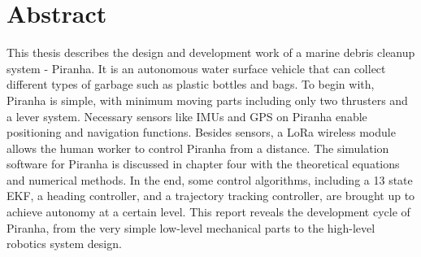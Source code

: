 \chapter*{Abstract}

This thesis describes the design and development work of a marine debris cleanup system - Piranha. It is an autonomous water surface vehicle that can collect different types of garbage such as plastic bottles and bags. To begin with, Piranha is simple, with minimum moving parts including only two thrusters and a lever system. Necessary sensors like IMUs and GPS on Piranha enable positioning and navigation functions. Besides sensors, a LoRa wireless module allows the human worker to control Piranha from a distance. The simulation software for Piranha is discussed in chapter four with the theoretical equations and numerical methods. In the end, some control algorithms, including a 13 state EKF, a heading controller, and a trajectory tracking controller, are brought up to achieve autonomy at a certain level. This report reveals the development cycle of Piranha, from the very simple low-level mechanical parts to the high-level robotics system design.